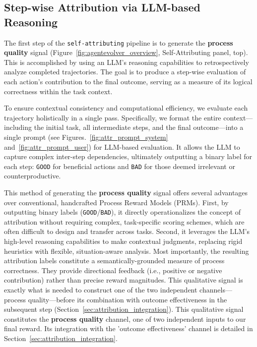 \subsection{Step-wise Attribution via LLM-based Reasoning} \label{sec:llm_attribution}
The first step of the \texttt{self-attributing} pipeline is to generate the \textbf{process quality} signal (Figure~\ref{fig:agentevolver_overview}, Self-Attributing panel, top). This is accomplished by using an LLM's reasoning capabilities to retrospectively analyze completed trajectories. The goal is to produce a step-wise evaluation of each action's contribution to the final outcome, serving as a measure of its logical correctness within the task context.


To ensure contextual consistency and computational efficiency, we evaluate each trajectory holistically in a single pass. 
Specifically, we format the entire context—including the initial task, all intermediate steps, and the final outcome—into a single prompt (see Figures.~\ref{fig:attr_prompt_system} and~\ref{fig:attr_prompt_user}) for LLM-based evaluation. 
It allows the LLM to capture complex inter-step dependencies, ultimately outputting a binary label for each step: \texttt{GOOD} for beneficial actions and \texttt{BAD} for those deemed irrelevant or counterproductive.








This method of generating the \textbf{process quality} signal offers several advantages over conventional, handcrafted Process Reward Models (PRMs). First, by outputting binary labels (\texttt{GOOD}/\texttt{BAD}), it directly operationalizes the concept of attribution without requiring complex, task-specific scoring schemes, which are often difficult to design and transfer across tasks. Second, it leverages the LLM's high-level reasoning capabilities to make contextual judgments, replacing rigid heuristics with flexible, situation-aware analysis. Most importantly, the resulting attribution labels constitute a semantically-grounded measure of process correctness. They provide directional feedback (i.e., positive or negative contribution) rather than precise reward magnitudes. This qualitative signal is exactly what is needed to construct one of the two independent channels—process quality—before its combination with outcome effectiveness in the subsequent step (Section~\ref{sec:attribution_integration}).
This qualitative signal constitutes the \textbf{process quality} channel, one of two independent inputs to our final reward. Its integration with the 'outcome effectiveness' channel is detailed in Section~\ref{sec:attribution_integration}.


